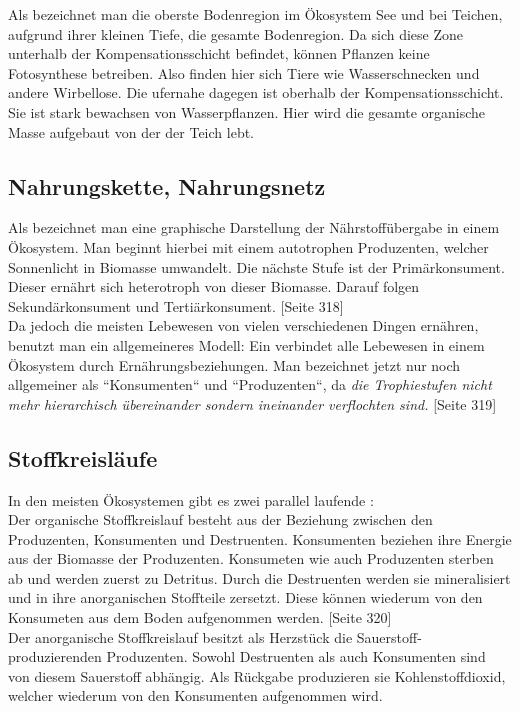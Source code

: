 \documentclass{article}
\begin{document}
    
        Als  bezeichnet man die oberste Bodenregion im Ökosystem See und bei Teichen, aufgrund ihrer kleinen Tiefe, die gesamte Bodenregion. \cite{Spektrum} Da sich diese Zone unterhalb der Kompensationsschicht befindet, können Pflanzen keine Fotosynthese betreiben. Also finden hier sich Tiere wie Wasserschnecken und andere Wirbellose.
        \vspace{5mm}
        Die ufernahe  dagegen ist oberhalb der Kompensationsschicht. Sie ist stark bewachsen von Wasserpflanzen. Hier wird die gesamte organische Masse aufgebaut von der der Teich lebt.
    
    \subsection{Nahrungskette, Nahrungsnetz}
    
        Als  bezeichnet man eine graphische Darstellung der Nährstoffübergabe in einem Ökosystem.  Man beginnt hierbei mit einem autotrophen Produzenten, welcher Sonnenlicht in Biomasse umwandelt. Die nächste Stufe ist der Primärkonsument. Dieser ernährt sich heterotroph von dieser Biomasse. Darauf folgen Sekundärkonsument und Tertiärkonsument. \cite{Biobuch} [Seite 318] \\
        \vspace{5mm}
        Da jedoch die meisten Lebewesen von vielen verschiedenen Dingen ernähren, benutzt man ein allgemeineres Modell: Ein  verbindet alle Lebewesen in einem Ökosystem durch Ernährungsbeziehungen. Man bezeichnet jetzt nur noch allgemeiner als ``Konsumenten`` und ``Produzenten``, da \textit{die Trophiestufen nicht mehr hierarchisch übereinander sondern ineinander verflochten sind.} \cite{Biobuch} [Seite 319]
    
    \subsection{Stoffkreisläufe}
    
        In den meisten Ökosystemen gibt es zwei parallel laufende : \\
        \vspace{5mm}
        Der organische Stoffkreislauf besteht aus der Beziehung zwischen den Produzenten, Konsumenten und Destruenten. Konsumenten beziehen ihre Energie aus der Biomasse der Produzenten. Konsumeten wie auch Produzenten sterben ab und werden zuerst zu Detritus. Durch die Destruenten werden sie mineralisiert und in ihre anorganischen Stoffteile zersetzt. Diese können wiederum von den Konsumeten aus dem Boden aufgenommen werden. \cite{Biobuch} [Seite 320] \\
        \vspace{5mm}
        Der anorganische Stoffkreislauf besitzt als Herzstück die Sauerstoff-produzierenden Produzenten. Sowohl Destruenten als auch Konsumenten sind von diesem Sauerstoff abhängig. Als Rückgabe produzieren sie Kohlenstoffdioxid, welcher wiederum von den Konsumenten aufgenommen wird.
\end{document}
